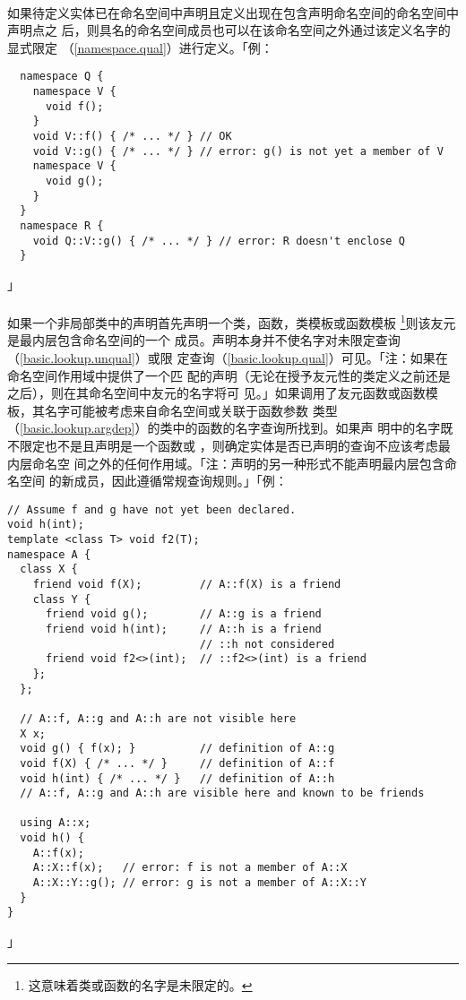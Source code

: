 \paragraph{}
如果待定义实体已在命名空间中声明且定义出现在包含声明命名空间的命名空间中声明点之
后，则具名的命名空间成员也可以在该命名空间之外通过该定义名字的显式限定
（\ref{namespace.qual}）进行定义。「例：
\begin{lstlisting}
  namespace Q {
    namespace V {
      void f();
    }
    void V::f() { /* ... */ } // OK
    void V::g() { /* ... */ } // error: g() is not yet a member of V
    namespace V {
      void g();
    }
  }
  namespace R {
    void Q::V::g() { /* ... */ } // error: R doesn't enclose Q
  }
\end{lstlisting}」

\paragraph{}
如果一个非局部类中的声明首先声明一个类，函数，类模板或函数模板
\footnote{这意味着类或函数的名字是未限定的。}则该友元是最内层包含命名空间的一个
成员。声明本身并不使名字对未限定查询（\ref{basic.lookup.unqual}）或限
定查询（\ref{basic.lookup.qual}）可见。「注：如果在命名空间作用域中提供了一个匹
配的声明（无论在授予友元性的类定义之前还是之后），则在其命名空间中友元的名字将可
见。」如果调用了友元函数或函数模板，其名字可能被考虑来自命名空间或关联于函数参数
类型（\ref{basic.lookup.argdep}）的类中的函数的名字查询所找到。如果声
明中的名字既不限定也不是且声明是一个函数或
，则确定实体是否已声明的查询不应该考虑最内层命名空
间之外的任何作用域。「注：声明的另一种形式不能声明最内层包含命名空间
的新成员，因此遵循常规查询规则。」「例：
\begin{lstlisting}
// Assume f and g have not yet been declared.
void h(int);
template <class T> void f2(T);
namespace A {
  class X {
    friend void f(X);         // A::f(X) is a friend
    class Y {
      friend void g();        // A::g is a friend
      friend void h(int);     // A::h is a friend
                              // ::h not considered
      friend void f2<>(int);  // ::f2<>(int) is a friend
    };
  };

  // A::f, A::g and A::h are not visible here
  X x;
  void g() { f(x); }          // definition of A::g
  void f(X) { /* ... */ }     // definition of A::f
  void h(int) { /* ... */ }   // definition of A::h
  // A::f, A::g and A::h are visible here and known to be friends

  using A::x;
  void h() {
    A::f(x);
    A::X::f(x);   // error: f is not a member of A::X
    A::X::Y::g(); // error: g is not a member of A::X::Y
  }
}
\end{lstlisting}」

